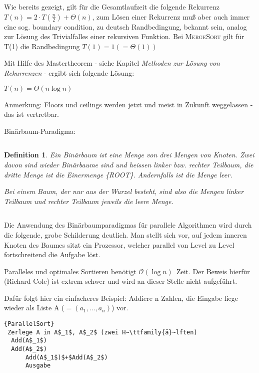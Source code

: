 \documentclass[ngerman,draft,parskip=half*,twoside]{scrreprt}
\theoremstyle{break}
\newtheorem{definition}{Definition}[chapter]
\theoremstyle{nonumberbreak}
\newcommand*{\OO}{\mathcal{O}}      %
\begin{document}
Wie bereits gezeigt, gilt für die Gesamtlaufzeit die folgende Rekurrenz $T(n) = 2\cdot T(\frac{n}{2})+\Theta(n)$, zum Lösen einer
Rekurrenz muß aber auch immer eine sog. boundary condition, zu deutsch Randbedingung, bekannt sein, analog zur Lösung des Trivialfalles einer rekursiven
Funktion. Bei \textsc{MergeSort} gilt für T(1) die Randbedingung $T(1) = 1(=\Theta(1))$

Mit Hilfe des Mastertheorem - siehe Kapitel \textit{Methoden zur Lösung von Rekurrenzen} - ergibt sich folgende Lösung:

$T(n) = \Theta(n \log n)$ 

Anmerkung: Floors und ceilings werden jetzt und meist in Zukunft weggelassen - das ist vertretbar.

\begin{description}
	\item [Binärbaum-Paradigma:] 
\end{description}
	
$  $

\begin{definition}
  Ein Binärbaum ist eine Menge von drei Mengen von Knoten. Zwei davon
  sind wieder Binärbaume sind und heissen linker bzw.  rechter
  Teilbaum, die dritte Menge ist die Einermenge \{ROOT\}. Andernfalls
  ist die Menge leer.
	  
  Bei einem Baum, der nur aus der Wurzel besteht, sind also die Mengen
  linker Teilbaum und rechter Teilbaum jeweils die leere Menge.
\end{definition}

$  $

Die Anwendung des Binärbaumparadigmas für parallele Algorithmen wird durch die folgende, grobe Schilderung deutlich.
Man stellt sich vor, auf jedem inneren Knoten des Baumes sitzt ein Prozessor, welcher parallel von Level zu Level fortschreitend die
Aufgabe löst.

Paralleles und optimales Sortieren benötigt $\OO(\log n)$~Zeit. Der Beweis hierfür (Richard Cole) ist extrem schwer und wird an dieser Stelle nicht aufgeführt.

Dafür folgt hier ein einfacheres Beispiel: Addiere n Zahlen, die Eingabe liege wieder als Liste A ($=(a_1,\ldots,a_n)$) vor.

\begin{Algorithmus}[h]
\begin{lstlisting}[frame=tlrb, mathescape=true, title=\textsc{ParallelSort}, gobble=1]{ParallelSort}
 Zerlege A in A$_1$, A$_2$ (zwei H~\ttfamily{ä}~lften)
  Add(A$_1$)
  Add(A$_2$)
      Add(A$_1$)$+$Add(A$_2$)
      Ausgabe
      \end{lstlisting}
  \end{Algorithmus}
\end{document}
